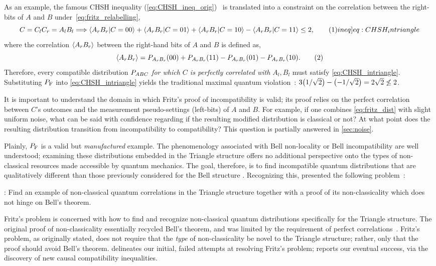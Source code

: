 \documentclass[aps, 10pt, english, twoside, pra, nofootinbib, tightenlines, longbibliography, superscriptaddress]{revtex4-1}
\begin{document}
    As an example, the famous CHSH inequality (\cref{eq:CHSH_ineq_orig})~\cite{CHSH_Original} is translated into a constraint on the correlation between the right-bits of $A$ and $B$ under~\cref{eq:fritz_relabelling},
    \[ C = C_{l}C_{r} = A_{l}B_{l} \Longrightarrow \ba{A_r B_r|C = 00} + \ba{A_r B_r|C = 01} + \ba{A_r B_r|C = 10} - \ba{A_r B_r|C = 11} \leq 2, \eq \label[ineq]{eq:CHSH_intriangle} \]
    where the correlation $\ba{A_r B_r}$ between the right-hand bits of $A$ and $B$ is defined as,
    \[ \ba{A_r B_r} = \prob[A_r B_r][00] + \prob[A_r B_r][11] - \prob[A_r B_r][01] - \prob[A_r B_r][10]. \eq \label{eq:right_bit_correlations} \]
    Therefore, every compatible distribution $\prob[ABC]$ \emph{for which $C$ is perfectly correlated with $A_l,B_l$} must satisfy \cref{eq:CHSH_intriangle}. Substituting $\prob[\fritz]$ into \cref{eq:CHSH_intriangle} yields the traditional maximal quantum violation~\cite{Cirelson_1980}: $3 \br{1/\sqrt{2}} - \br{-1/\sqrt{2}} = 2\sqrt{2} \not \leq 2$.

    It is important to understand the domain in which Fritz's proof of incompatibility is valid; its proof relies on the perfect correlation between $C$'s outcomes and the measurement pseudo-settings (left-bits) of $A$ and $B$. For example, if one combines \cref{eq:fritz_dist} with slight uniform noise, what can be said with confidence regarding if the resulting modified distribution is classical or not? At what point does the resulting distribution transition from incompatibility to compatibility? This question is partially answered in \cref{sec:noise}.

    Plainly, $\prob[\fritz]$ is a valid but \textit{manufactured} example. The phenomenology associated with Bell non-locality or Bell incompatibility are well understood; examining these distributions embedded in the Triangle structure offers no additional perspective onto the types of non-classical resources made accessible by quantum mechanics. The goal, therefore, is to find incompatible quantum distributions that are qualitatively different than those previously considered for the Bell structure \cite{Gisin_2017}. Recognizing this, \citet{Fritz_2012} presented the following problem~\cite[Problem 2.17]{Fritz_2012}:

    : Find an example of non-classical quantum correlations in the Triangle structure together with a proof of its non-classicality which does not hinge on Bell’s theorem.

    Fritz's problem is concerned with how to find and recognize non-classical quantum distributions specifically for the Triangle structure. The original proof of non-classicality essentially recycled Bell's theorem, and was limited by the requirement of perfect correlations~\cite{Fritz_2012}. Fritz's problem, as originally stated, does not require that the \emph{type} of non-classicality be novel to the Triangle structure; rather, only that the proof should avoid Bell's theorem.  delineates our initial, failed attempts at resolving Fritz's problem;  reports our eventual success, via the discovery of new causal compatibility inequalities.
\end{document}
